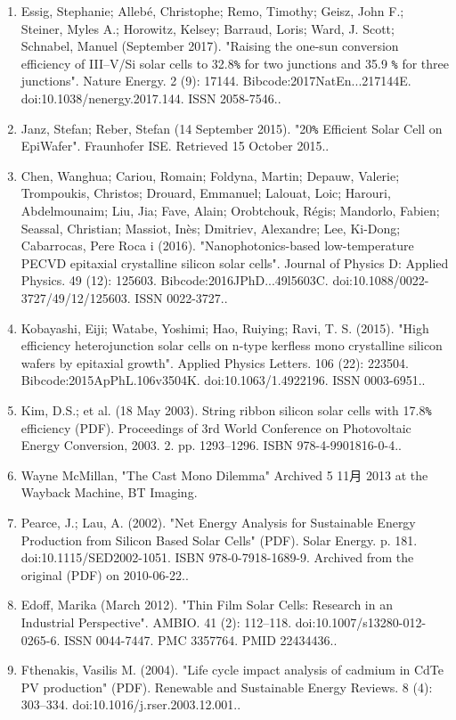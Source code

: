 \begin{enumerate}
\item Essig, Stephanie; Allebé, Christophe; Remo, Timothy; Geisz, John F.; Steiner, Myles A.; Horowitz, Kelsey; Barraud, Loris; Ward, J. Scott; Schnabel, Manuel (September 2017). "Raising the one-sun conversion efficiency of III–V/Si solar cells to 32.8\verb|%| for two junctions and 35.9 \verb|%| for three junctions". Nature Energy. 2 (9): 17144. Bibcode:2017NatEn...217144E. doi:10.1038/nenergy.2017.144. ISSN 2058-7546..
\item Janz, Stefan; Reber, Stefan (14 September 2015). "20\verb|%| Efficient Solar Cell on EpiWafer". Fraunhofer ISE. Retrieved 15 October 2015..
\item Chen, Wanghua; Cariou, Romain; Foldyna, Martin; Depauw, Valerie; Trompoukis, Christos; Drouard, Emmanuel; Lalouat, Loic; Harouri, Abdelmounaim; Liu, Jia; Fave, Alain; Orobtchouk, Régis; Mandorlo, Fabien; Seassal, Christian; Massiot, Inès; Dmitriev, Alexandre; Lee, Ki-Dong; Cabarrocas, Pere Roca i (2016). "Nanophotonics-based low-temperature PECVD epitaxial crystalline silicon solar cells". Journal of Physics D: Applied Physics. 49 (12): 125603. Bibcode:2016JPhD...49l5603C. doi:10.1088/0022-3727/49/12/125603. ISSN 0022-3727..
\item Kobayashi, Eiji; Watabe, Yoshimi; Hao, Ruiying; Ravi, T. S. (2015). "High efficiency heterojunction solar cells on n-type kerfless mono crystalline silicon wafers by epitaxial growth". Applied Physics Letters. 106 (22): 223504. Bibcode:2015ApPhL.106v3504K. doi:10.1063/1.4922196. ISSN 0003-6951..
\item Kim, D.S.; et al. (18 May 2003). String ribbon silicon solar cells with 17.8\verb|%| efficiency (PDF). Proceedings of 3rd World Conference on Photovoltaic Energy Conversion, 2003. 2. pp. 1293–1296. ISBN 978-4-9901816-0-4..
\item Wayne McMillan, "The Cast Mono Dilemma" Archived 5 11月 2013 at the Wayback Machine, BT Imaging.
\item Pearce, J.; Lau, A. (2002). "Net Energy Analysis for Sustainable Energy Production from Silicon Based Solar Cells" (PDF). Solar Energy. p. 181. doi:10.1115/SED2002-1051. ISBN 978-0-7918-1689-9. Archived from the original (PDF) on 2010-06-22..
\item Edoff, Marika (March 2012). "Thin Film Solar Cells: Research in an Industrial Perspective". AMBIO. 41 (2): 112–118. doi:10.1007/s13280-012-0265-6. ISSN 0044-7447. PMC 3357764. PMID 22434436..
\item Fthenakis, Vasilis M. (2004). "Life cycle impact analysis of cadmium in CdTe PV production" (PDF). Renewable and Sustainable Energy Reviews. 8 (4): 303–334. doi:10.1016/j.rser.2003.12.001..

\end{enumerate}
